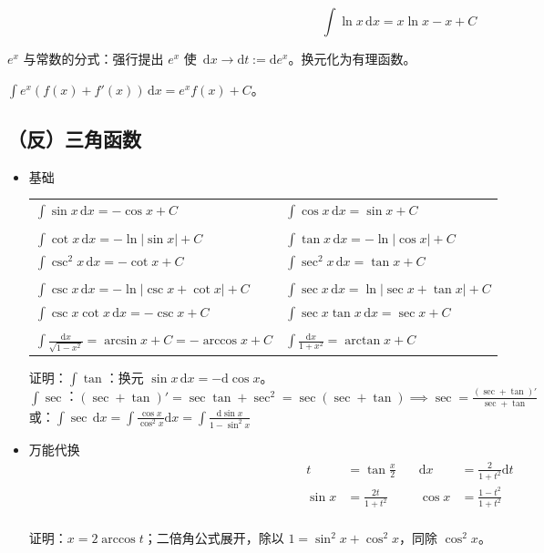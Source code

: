 \documentclass[12pt, a4paper, UTF8, openany]{ctexbook}
\newcommand{\dif}{\mathrm{d}}
\newcommand{\difx}{\,\mathrm{d}x}
\begin{document}
        $$\int\ln x\difx = x\ln x - x + C$$

        $e^x$ 与常数的分式：强行提出 $e^x$ 使 $\difx \to \dif t := \dif e^x$。换元化为有理函数。

        $\int e^x(f(x) + f'(x))\difx = e^xf(x) + C$。

        \subsection{（反）三角函数}
        \begin{itemize}
            \item 基础
                \begin{longtable}[h]{*{2}{w{l}{8cm}}}
                    $\int \sin x\,\dif x = -\cos x + C$ & $\int \cos x\,\dif x = \sin x + C$\\
                    &\\
                    $\int \cot x\,\dif x = -\ln|\sin x| + C$ & $\int \tan x\,\dif x = -\ln|\cos x| + C$\\
                    $\int \csc^2 x\difx = -\cot x + C$ & $\int \sec^2 x\difx = \tan x + C$\\
                    &\\
                    $\int \csc x\difx = -\ln|\csc x + \cot x| + C$ & $\int \sec x\difx = \ln|\sec x + \tan x| + C$\\
                    $\int \csc x \cot x\difx = -\csc x + C$ & $\int \sec x \tan x\difx = \sec x + C$\\
                    &\\
                    $\int \frac{\dif x}{\sqrt{1 - x^2}} = \arcsin x + C = -\arccos x + C$ & 
                    $\int \frac{\dif x}{1 + x^2} = \arctan x + C$
                \end{longtable}
                证明：$\int \tan$：换元 $\sin x\difx = -\dif\cos x$。\\
                    $\int \sec$：$(\sec + \tan)' = \sec\tan + \sec^2 = \sec(\sec + \tan) 
                                \implies \sec = \frac{(\sec + \tan)'}{\sec + \tan}$\\
                    或：$\int\sec\difx = \int \frac{\cos x}{\cos^2 x}\dif x = \int \frac{\dif\sin x}{1 - \sin^2 x}$
            
            \item 万能代换
                $$\begin{aligned}
                    t &= \tan\frac{x}{2}\quad &\dif x &= \frac{2}{1 + t^2}\dif t\\
                    \sin x &= \frac{2t}{1 + t^2}\quad &\cos x &= \frac{1 - t^2}{1 + t^2}
                \end{aligned}$$\\
                证明：$x = 2\arccos t$；二倍角公式展开，除以 $1 = \sin^2 x + \cos^2 x$，同除 $\cos^2 x$。


\end{itemize}
\end{document}
